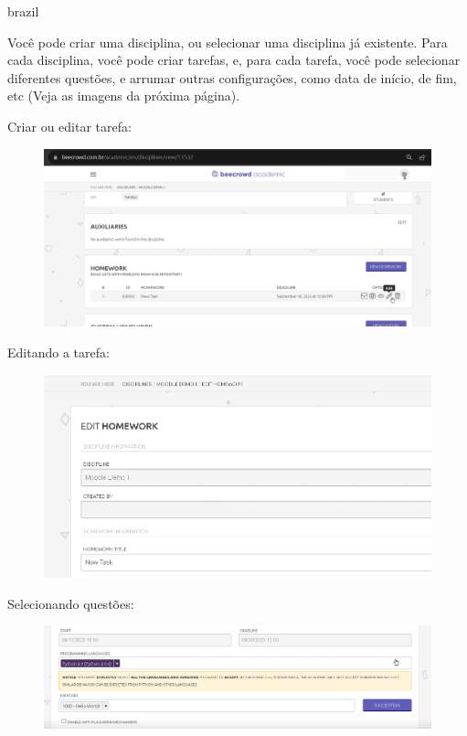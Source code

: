 \begin{otherlanguage*}{brazil}
\begin{enumerate}
    Você pode criar uma disciplina, ou selecionar uma disciplina já existente. Para cada disciplina, você pode criar tarefas, e, para cada tarefa, você pode selecionar diferentes questões, e arrumar outras configurações, como data de início, de fim, etc (Veja as imagens da próxima página).

    Criar ou editar tarefa:

    \begin{figure}[H]
        \centering
            \includegraphics[scale=0.35]{pictures/apendices/apendice_b_7.png}
    \end{figure}

    Editando a tarefa:

    \begin{figure}[H]
        \centering
            \includegraphics[scale=0.45]{pictures/apendices/apendice_b_8.png}
    \end{figure}

    Selecionando questões:

    \begin{figure}[H]
        \centering
            \includegraphics[scale=0.3]{pictures/apendices/apendice_b_9.png}
    \end{figure}
    

\end{enumerate}
\end{otherlanguage*}
